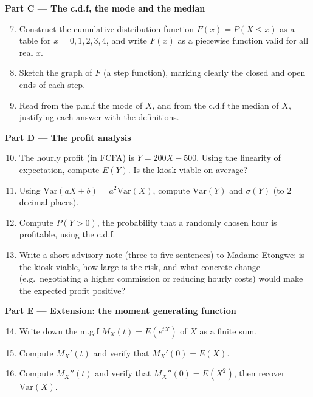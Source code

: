 \documentclass[11pt]{article}
\newcommand{\cle}[1]{{\popxbold\color{popdark}#1}}
\newcounter{popsec}
\newcounter{popsub}
\newcommand{\courssub}[1]{%
  \stepcounter{popsub}%
  \par\vspace{9pt}\noindent{\popxbold\fontsize{11.5}{13}\selectfont\color{popink}{\color{poporange}\thepopsec.\thepopsub}\hspace{6pt}#1}\par\nopagebreak\vspace{4pt}
}
\begin{document}
\textbf{Part C — The c.d.f, the mode and the median}\par

\begin{enumerate}
\setcounter{enumi}{6}
\item Construct the cumulative distribution function $F(x)=P(X\le x)$ as a table for $x=0,1,2,3,4$, and write $F(x)$ as a piecewise function valid for all real $x$.
\item Sketch the graph of $F$ (a step function), marking clearly the closed and open ends of each step.
\item Read from the p.m.f the \cle{mode} of $X$, and from the c.d.f the \cle{median} of $X$, justifying each answer with the definitions.
\end{enumerate}

\textbf{Part D — The profit analysis}\par

\begin{enumerate}
\setcounter{enumi}{9}
\item The hourly profit (in FCFA) is $Y=200X-500$. Using the linearity of expectation, compute $E(Y)$. Is the kiosk viable on average?
\item Using $\mathrm{Var}(aX+b)=a^2\mathrm{Var}(X)$, compute $\mathrm{Var}(Y)$ and $\sigma(Y)$ (to $2$ decimal places).
\item Compute $P(Y>0)$, the probability that a randomly chosen hour is profitable, using the c.d.f.
\item Write a short advisory note (three to five sentences) to Madame Etongwe: is the kiosk viable, how large is the risk, and what concrete change (e.g.\ negotiating a higher commission or reducing hourly costs) would make the expected profit positive?
\end{enumerate}

\textbf{Part E — Extension: the moment generating function}\par

\begin{enumerate}
\setcounter{enumi}{13}
\item Write down the m.g.f $M_X(t)=E\!\left(e^{tX}\right)$ of $X$ as a finite sum.
\item Compute $M_X'(t)$ and verify that $M_X'(0)=E(X)$.
\item Compute $M_X''(t)$ and verify that $M_X''(0)=E(X^2)$, then recover $\mathrm{Var}(X)$.
\end{enumerate}

\courssub{Model Answer}
\end{document}
